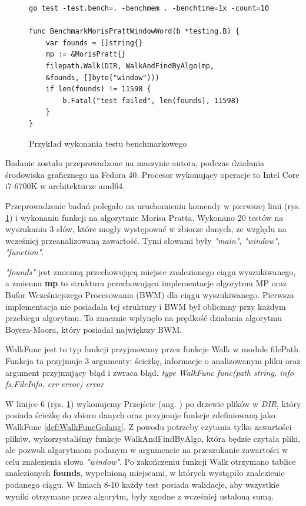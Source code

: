 \begin{figure}[h]
  \centering
  \begin{lstlisting}
go test -test.bench=. -benchmem . -benchtime=1x -count=10

func BenchmarkMorisPrattWindowWord(b *testing.B) {
	var founds = []string{}
	mp := &MorisPratt{}
	filepath.Walk(DIR, WalkAndFindByAlgo(mp,
    &founds, []byte("window")))
	if len(founds) != 11598 {
		b.Fatal("test failed", len(founds), 11598)
	}
}
  \end{lstlisting}
  \caption{Przykład wykonania testu benchmarkowego}
  \label{fig:code:examplePerfTest}
\end{figure}
Badanie zostało przeprowadzone na maszynie autora, podczas działania środowiska
graficznego na Fedora 40. Procesor wykonujący operacje to Intel Core i7-6700K
w architekturze amd64.

Przeprowadzenie badań polegało na uruchomieniu komendy w pierwszej linii (rys. 
\ref{fig:code:examplePerfTest}) i wykonaniu funkcji na algorytmie Morisa Pratta. 
Wykonano 20 testów na wyszukaniu 3 słów, które mogły występować w zbiorze danych,
ze względu na wcześniej przeanalizowaną zawartość. Tymi słowami były 
\textit{"main"}, \textit{"window"}, \textit{"function"}.

\textit{"founds"} jest zmienną przechowującą miejsce znalezionego 
ciągu wyszukiwanego, a zmienna \textbf{mp} to struktura przechowująca implementacje algorytmu MP oraz
Bufor Wcześniejszego Procesowania (BWM) dla ciągu wyszukiwanego. Pierwsza implementacja nie 
posiadała tej struktury i BWM był obliczany przy każdym przebiegu algorytmu.
 To znacznie wpłynęło na prędkość działania algorytmu Boyera-Moora, który posiadał największy BWM.

\begin{Definition}\label{def:WalkFuncGolang}
WalkFunc jest to typ funkcji przyjmowany przez funkcje Walk w module filePath.
Funkcja ta przyjmuje 3 argumenty: ścieżkę, informacje o analizowanym pliku oraz
argument przyjmujący błąd i zwraca błąd. \newline \newline
\textit{type WalkFunc func(path string, info fs.FileInfo, err error) error}
\end{Definition}

W linijce 6 (rys. \ref{fig:code:examplePerfTest}) wykonujemy Przejście (ang. 
) po drzewie plików w \textit{DIR}, który posiada ścieżkę do 
zbioru danych oraz przyjmuje funkcje zdefiniowaną jako WalkFunc 
\ref{def:WalkFuncGolang}. Z powodu potrzeby czytania tylko zawartości plików,
wykorzystaliśmy funkcje WalkAndFindByAlgo, która będzie czytała pliki, ale 
pozwoli algorytmom podanym w argumencie na przeszukanie zawartości w celu 
znalezienia słowa \textit{"window"}. Po zakończeniu funkcji Walk otrzymano 
tablice znalezionych \textbf{founds}, wypełnioną miejscami, w których wystąpiło 
znalezienie podanego ciągu. W liniach 8-10 każdy test posiada walidacje, aby wszystkie wyniki 
otrzymane przez algorytm, były zgodne z wcześniej ustaloną sumą.

